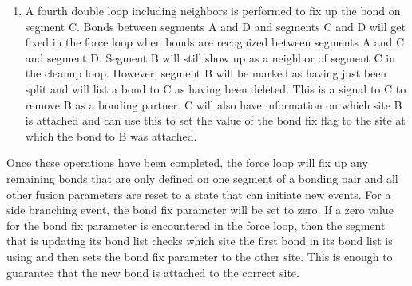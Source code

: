 \documentclass[12pt]{article}
\begin{document}
\begin{enumerate}
\item A fourth double loop including neighbors is performed to fix up the bond on segment C.
Bonds between segments A and D and segments C and D will get fixed in the force loop when
bonds are recognized between segments A and C and segment D. Segment B will still show up as
a neighbor of
segment C in the cleanup loop. However, segment B will be marked as having just been split and
will list a
bond to C as having been deleted. This is a signal to C to remove B as a bonding partner. C
will also have information on which site B is attached and can use this to set the value of
the bond fix flag to the site at which the bond to B was attached.
\end{enumerate}
Once these operations have been completed, the force loop will fix up any remaining
bonds that are only defined on one segment of a bonding pair and all other fusion parameters are
reset to a state that can initiate new events. For a side branching event, the bond fix parameter
will be set to zero. If a zero value for the bond fix parameter is encountered in the force loop,
then the segment that is
updating its bond list checks which site the first bond in its bond list is using and then sets
the bond fix parameter to the other site. This is enough to guarantee that the new bond is
attached to the correct site.


\end{document}
